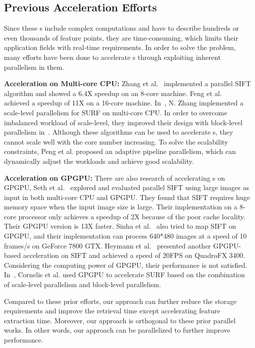 \subsection{Previous Acceleration Efforts}

Since these {\lfea}s include complex computations and have to describe hundreds or even thousands of feature points, they are time-consuming, which limits their application fields with real-time requirements. In order to solve the problem, many efforts have been done to accelerate {\lfea}s through exploiting inherent parallelism in them.

\textbf{Acceleration on Multi-core CPU: }
Zhang et al.~\cite{zhang2008sift} implemented a parallel SIFT algorithm and showed a 6.4X speedup on an 8-core machine. Feng et al.~\cite{feng2008parallelization} achieved a speedup of 11X on a 16-core machine. In~\cite{zhang2009computing}, N. Zhang implemented a scale-level parallelism for SURF on multi-core CPU. In order to overcome imbalanced workload of scale-level, they improved their design with block-level parallelism in~\cite{zhang2010computing}. Although these algorithms can be used to accelerate {\lfea}s, they cannot scale well with the core number increasing. To solve the scalability constraints, Peng et al.\cite{chen2012adaptive} proposed an adaptive pipeline parallelism, which can dynamically adjust the workloads and achieve good scalability.


\textbf{Acceleration on GPGPU: } There are also research of accelerating {\lfea}s on GPGPU, Seth et al.~\cite{warn2009accelerating} explored and evaluated parallel SIFT using large images as input in both multi-core CPU and GPGPU. They found that SIFT requires huge memory space when the input image size is large. Their implementation on a 8-core processor only achieves a speedup of 2X because of the poor cache locality. Their GPGPU version is 13X faster. Sinha et al.~\cite{sinha2011feature} also tried to map SIFT on GPGPU, and their implementation can process 640*480 images at a speed of 10 frames/s on GeForce 7800 GTX. Heymann et al.~\cite{heymann2007sift} presented another GPGPU-based acceleration on SIFT and achieved a speed of 20FPS on QuadroFX 3400. Considering the computing power of GPGPU, their performance is not satisfied. In~\cite{cornelis2008fast}, Cornelis et al. used GPGPU to accelerate SURF based on the combination of scale-level parallelism and block-level parallelism.

Compared to these prior efforts, our approach can further reduce the storage requirements and improve the retrieval time except accelerating feature extraction time. Moreover, our approach is orthogonal to these prior parallel works. In other words, our approach can be parallelized to further improve performance.






